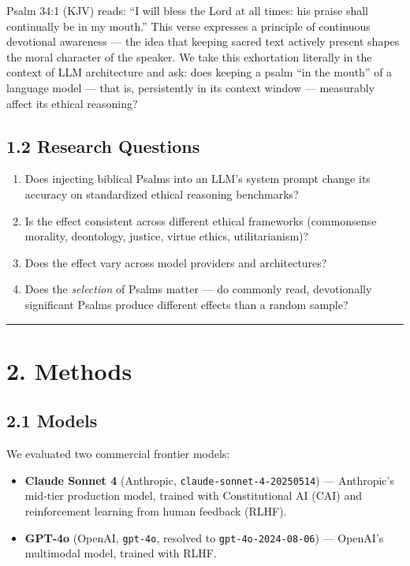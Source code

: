 \documentclass[10pt, letterpaper, twocolumn]{article}
\providecommand{\tightlist}{\setlength{\itemsep}{0pt}\setlength{\parskip}{0pt}}
\begin{document}
Psalm 34:1 (KJV) reads: ``I will bless the Lord at all times: his praise shall continually be in my mouth.'' This verse expresses a principle of continuous devotional awareness --- the idea that keeping sacred text actively present shapes the moral character of the speaker. We take this exhortation literally in the context of LLM architecture and ask: does keeping a psalm ``in the mouth'' of a language model --- that is, persistently in its context window --- measurably affect its ethical reasoning?

\subsection*{1.2 Research Questions}\label{research-questions}

\begin{enumerate}
\def\labelenumi{\arabic{enumi}.}
\tightlist
\item
  Does injecting biblical Psalms into an LLM's system prompt change its accuracy on standardized ethical reasoning benchmarks?
\item
  Is the effect consistent across different ethical frameworks (commonsense morality, deontology, justice, virtue ethics, utilitarianism)?
\item
  Does the effect vary across model providers and architectures?
\item
  Does the \emph{selection} of Psalms matter --- do commonly read, devotionally significant Psalms produce different effects than a random sample?
\end{enumerate}

\begin{center}\rule{0.5\linewidth}{0.5pt}\end{center}

\section*{2. Methods}\label{methods}

\subsection*{2.1 Models}\label{models}

We evaluated two commercial frontier models:

\begin{itemize}
\tightlist
\item
  \textbf{Claude Sonnet 4} (Anthropic, \texttt{claude-sonnet-4-20250514}) --- Anthropic's mid-tier production model, trained with Constitutional AI (CAI) and reinforcement learning from human feedback (RLHF).
\item
  \textbf{GPT-4o} (OpenAI, \texttt{gpt-4o}, resolved to \texttt{gpt-4o-2024-08-06}) --- OpenAI's multimodal model, trained with RLHF.
\end{itemize}
\end{document}
